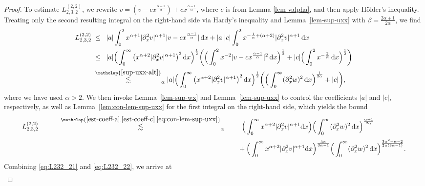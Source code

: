 \documentclass[reqno,12pt]{amsart}
\renewcommand{\d}{\ensuremath{\mathrm{d}}}
\renewcommand{\d}{\ensuremath{{\rm d}}}
\numberwithin{equation}{section}
\begin{document}
\begin{proof}
To estimate $ L_{2,3,2}^{(2,2)}$, we rewrite $v = (v - cx^{\frac{\alpha-1}{\alpha}}) + cx^{\frac{\alpha-1}{\alpha}}$, where $c$ is from Lemma \ref{lem-valpha}, and then apply H\"older's inequality. Treating only the second resulting integral on the right-hand side via Hardy's inequality and Lemma~\ref{lem-sup-uxx} with $\beta = \tfrac{2\alpha+1}{2\alpha}$, we find
%
\begin{align*}
   L_{2,3,2}^{(2,2)}
    \; &\leq_{\phantom{\alpha}}
    |a| \int_0^2 x^{\alpha+1} |\partial_x^2 v|^{\alpha+1} |v- cx^{\frac{\alpha-1}{\alpha}}|\, \d x +    |a||c| \int_0^2 x^{-\frac{1}{\alpha}+ (\alpha+2)}  |\partial_x^2 v|^{\alpha+1} \, \d x
    \\
    &\leq_{\phantom{\alpha}}
    |a| \Big( \int_0^\infty  \left( x^{\alpha+2} |\partial_x^2 v|^{\alpha+1} \right)^2 \d x \Big)^\frac{1}{2} \bigg( \Big( \int_0^2 x^{-2} |v-cx^\frac{\alpha-1}{\alpha}|^2 \, \d x \Big)^\frac{1}{2} +
    |c| \Big( \int_0^2 x^{-\frac{2}{\alpha}} \, \d x \Big)^\frac{1}{2} \bigg)\\
    &\stackrel{\mathclap{\eqref{sup-uxx-alt}}}{\lesssim}_{\alpha} |a| \Big( \int_0^\infty  \left( x^{\alpha+2} |\partial_x^2 v|^{\alpha+1} \right)^2 \d x \Big)^\frac{1}{2} \bigg(  \Big(\int_0^\infty  (\partial_x^2 w)^2\, \d x\Big)^\frac{1}{2\alpha} +
    |c| \bigg), 
\end{align*}
%
where we have used $\alpha > 2$. We then invoke Lemma~\ref{lem-sup-wx} and Lemma~\ref{lem-sup-uxx} to control the coefficients $|a|$ and $|c|$, respectively, as well as Lemma~\ref{lem:con-lem-sup-uxx} for the first integral on the right-hand side, which yields the bound
\begin{align}\label{eq:L232_22}
    L_{2,3,2}^{(2,2)} \quad\qquad
    &\stackrel{\mathclap{\eqref{est-coeff-a}, \eqref{est-coeff-c}, \eqref{eq:con-lem-sup-uxx}}}{\lesssim}_{\alpha} \;\qquad \Big( \int_0^\infty  x^{\alpha+2} |\partial_x^2 v|^{\alpha+1} \d x \Big) \Big(\int_0^\infty  (\partial_x^2 w)^2\, \d x\Big)^\frac{\alpha+1}{2\alpha} \nonumber
    \\
    &\phantom{\stackrel{\mathclap{\eqref{est-coeff-a}, \eqref{est-coeff-c}, \eqref{eq:con-lem-sup-uxx}}}{\lesssim}_{\alpha}} \qquad\;
    + \Big( \int_0^\infty  x^{\alpha+2} |\partial_x^2 v|^{\alpha+1} \d x \Big)^\frac{3\alpha}{3\alpha-1} \Big(\int_0^\infty  (\partial_x^2 w)^2\, \d x\Big)^\frac{3\alpha^2+\alpha -2}{2\alpha(3\alpha-1)}. 
\end{align}
%
Combining \eqref{eq:L232_21} and \eqref{eq:L232_22}, we arrive at
\begin{align*}

\end{align*}
\end{proof}
\end{document}
